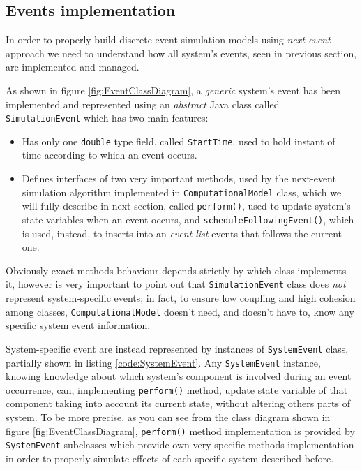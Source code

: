 \documentclass[10pt,a4paper]{article}
\begin{document}
\subsection{Events implementation}

In order to properly build discrete-event simulation models using \textit{next-event} approach we need to understand how all system's events, seen in previous section, are implemented and managed.

As shown in figure \ref{fig:EventClassDiagram}, a \textit{generic} system's event has been implemented and represented using an \textit{abstract} Java class called \texttt{SimulationEvent} which has two main features:

\begin{itemize}
\item Has only one \texttt{double} type field, called \texttt{StartTime}, used to hold instant of time according to which an event occurs.
\item Defines interfaces of two very important methods, used by the next-event simulation algorithm implemented in \texttt{ComputationalModel} class, which we will fully describe in next section, called \texttt{perform()}, used to update system's state variables when an event occurs, and \texttt{schedule\-Following\-Event()}, which is used, instead, to inserts into an \textit{event list} events that follows the current one.
\end{itemize}

Obviously exact methods behaviour depends strictly by which class implements it, however is very important to point out that \texttt{SimulationEvent} class does \textit{not} represent system-specific events; in fact, to ensure low coupling and high cohesion among classes, \texttt{ComputationalModel} doesn't need, and doesn't have to, know any specific system event information. 
 
System-specific event are instead represented by instances of \texttt{SystemEvent} class, partially shown in listing \ref{code:SystemEvent}. Any \texttt{SystemEvent} instance, knowing knowledge about which system's component is involved during an event occurrence, can, implementing \texttt{perform()} method, update state variable of that component taking into account its current state, without altering others parts of system. To be more precise, as you can see from the class diagram shown in figure \ref{fig:EventClassDiagram}, \texttt{perform()} method implementation is provided by \texttt{SystemEvent} subclasses which provide own very specific methods implementation in order to properly simulate effects of each specific system described before.
\end{document}

